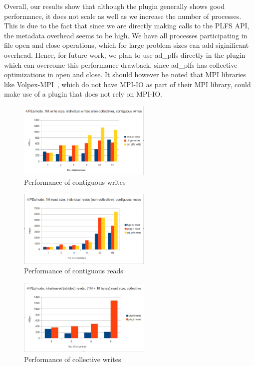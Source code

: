 Overall, our results show that although the plugin generally shows good performance, it does not scale as well as we increase the number of processes. This is due to the fact that since we are directly making calls to the PLFS API, the metadata overhead seems to be high. We have all processes participating in file open and close operations, which for large problem sizes can add siginificant overhead. Hence, for future work, we plan to use ad\_plfs directly in the plugin which can overcome this performance drawback, since ad\_plfs has collective optimizations in open and close. It should however be noted that MPI libraries like Volpex-MPI~\cite{volpex}, which do not have MPI-IO as part of their MPI library, could make use of a plugin that does not rely on MPI-IO.  

\begin{figure}[!t]
\centering
\includegraphics[width=2.5in]{4PEs_node_1M_contig_ind_writes}
\caption{Performance of contiguous writes}
\label{write_contig}
\end{figure}

\begin{figure}[!t]
\centering
\includegraphics[width=2.5in]{4pes_node_1m_ind_read}
\caption{Performance of contiguous reads}
\label{read_contig}
\end{figure}


\begin{figure}[!t]
\centering
\includegraphics[width=2.5in]{4pes_interleaved_1m10_coll_reads}
\caption{Performance of collective writes}
\label{write_collective}
\end{figure}


